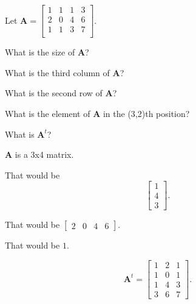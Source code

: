 
%
%
%

	Let $\mathbf{A} = \begin{bmatrix}
	1 & 1 & 1 & 3 \\
	2 & 0 & 4 & 6 \\
	1 & 1 & 3 & 7 \\
	\end{bmatrix}$.
	\begin{subproblem}
		\item What is the size of $\mathbf{A}$?
		\item What is the third column of $\mathbf{A}$?
		\item What is the second row of $\mathbf{A}$?
		\item What is the element of $\mathbf{A}$ in the (3,2)th position?
		\item What is $\mathbf{A}^t$?
	\end{subproblem}

\solution
	\begin{subproblem}
		\item $\mathbf{A}$ is a 3x4 matrix.
		\item That would be $$\begin{bmatrix} 1 \\ 4 \\ 3 \end{bmatrix}.$$
		\item That would be $\begin{bmatrix} 2 & 0 & 4 & 6 \end{bmatrix}.$
		\item That would be $1$.
		\item
			$$\mathbf{A}^t =
			\begin{bmatrix}
				1 & 2 & 1 \\
				1 & 0 & 1 \\
				1 & 4 & 3 \\
				3 & 6 & 7
			\end{bmatrix}.$$
	\end{subproblem}
